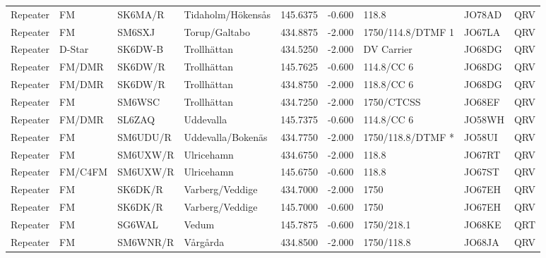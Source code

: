 \begin{landscape}
\begin{longtable}{llllrrlll}
	Repeater          & FM              & SK6MA/R  & Tidaholm/Hökensås     &     145.6375 &     -0.600 & 118.8             & JO78AD      & QRV      \\
	Repeater          & FM              & SM6SXJ   & Torup/Galtabo         &     434.8875 &     -2.000 & 1750/114.8/DTMF 1 & JO67LA      & QRV      \\
	Repeater          & D-Star          & SK6DW-B  & Trollhättan           &     434.5250 &     -2.000 & DV Carrier        & JO68DG      & QRV      \\
	Repeater          & FM/DMR          & SK6DW/R  & Trollhättan           &     145.7625 &     -0.600 & 114.8/CC 6        & JO68DG      & QRV      \\
	Repeater          & FM/DMR          & SK6DW/R  & Trollhättan           &     434.8750 &     -2.000 & 118.8/CC 6        & JO68DG      & QRV      \\
	Repeater          & FM              & SM6WSC   & Trollhättan           &     434.7250 &     -2.000 & 1750/CTCSS        & JO68EF      & QRV      \\
	Repeater          & FM/DMR          & SL6ZAQ   & Uddevalla             &     145.7375 &     -0.600 & 114.8/CC 6        & JO58WH      & QRV      \\
	Repeater          & FM              & SM6UDU/R & Uddevalla/Bokenäs     &     434.7750 &     -2.000 & 1750/118.8/DTMF * & JO58UI      & QRV      \\
	Repeater          & FM              & SM6UXW/R & Ulricehamn            &     434.6750 &     -2.000 & 118.8             & JO67RT      & QRV      \\
	Repeater          & FM/C4FM         & SM6UXW/R & Ulricehamn            &     145.6750 &     -0.600 & 118.8             & JO67ST      & QRV      \\
	Repeater          & FM              & SK6DK/R  & Varberg/Veddige       &     434.7000 &     -2.000 & 1750              & JO67EH      & QRV      \\
	Repeater          & FM              & SK6DK/R  & Varberg/Veddige       &     145.7000 &     -0.600 & 1750              & JO67EH      & QRV      \\
	Repeater          & FM              & SG6WAL   & Vedum                 &     145.7875 &     -0.600 & 1750/218.1        & JO68KE      & QRT      \\
	Repeater          & FM              & SM6WNR/R & Vårgårda              &     434.8500 &     -2.000 & 1750/118.8        & JO68JA      & QRV      \\

\end{longtable}
\end{landscape}

